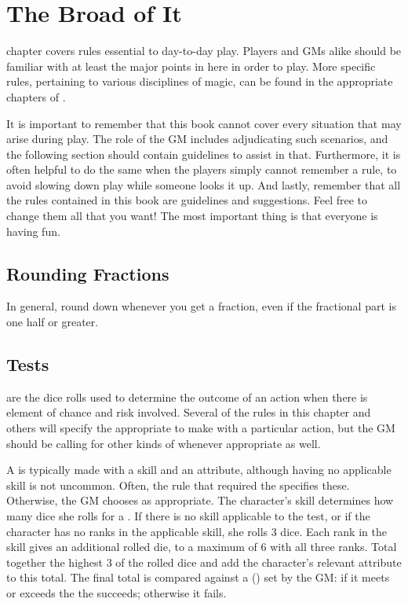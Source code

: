 \chapter{The Broad of It}

 chapter covers rules essential to day-to-day play.
Players and GMs alike should be familiar with at least the major points in here in order to play.
More specific rules, pertaining to various disciplines of magic, can be found in the appropriate chapters of .

It is important to remember that this book cannot cover every situation that may arise during play.
The role of the GM includes adjudicating such scenarios, and the following section should contain guidelines to assist in that.
Furthermore, it is often helpful to do the same when the players simply cannot remember a rule, to avoid slowing down play while someone looks it up.
And lastly, remember that all the rules contained in this book are guidelines and suggestions.
Feel free to change them all that you want!
The most important thing is that everyone is having fun.

\section{Rounding Fractions}

In general, round down whenever you get a fraction, even if the fractional part is one half or greater.

\section{Tests}

\capital{\tests} are the dice rolls used to determine the outcome of an action when there is element of chance and risk involved.
Several of the rules in this chapter and others will specify the appropriate {\test} to make with a particular action, but the GM should be calling for other kinds of {\tests} whenever appropriate as well.

A {\test} is typically made with a skill and an attribute, although having no applicable skill is not uncommon.
Often, the rule that required the {\test} specifies these.
Otherwise, the GM chooses as appropriate.
The character's skill determines how many dice she rolls for a {\test}.
If there is no skill applicable to the test, or if the character has no ranks in the applicable skill, she rolls 3 dice.
Each rank in the skill gives an additional rolled die, to a maximum of 6 with all three ranks.
Total together the highest 3 of the rolled dice and add the character's relevant attribute to this total.
The final total is compared against a {\targetnumber} ({\tn}) set by the GM: if it meets or exceeds the {\tn} the {\test} succeeds; otherwise it fails.


